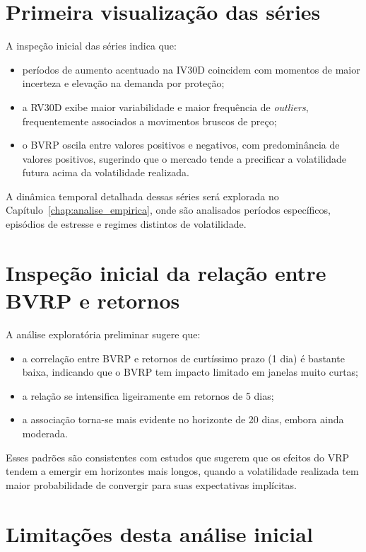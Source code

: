 \section{Primeira visualização das séries}

A inspeção inicial das séries indica que:

\begin{itemize}
    \item períodos de aumento acentuado na IV30D coincidem com momentos de maior
          incerteza e elevação na demanda por proteção;
    \item a RV30D exibe maior variabilidade e maior frequência de \textit{outliers},
          frequentemente associados a movimentos bruscos de preço;
    \item o BVRP oscila entre valores positivos e negativos, com predominância
          de valores positivos, sugerindo que o mercado tende a precificar a
          volatilidade futura acima da volatilidade realizada.
\end{itemize}

A dinâmica temporal detalhada dessas séries será explorada no
Capítulo~\ref{chap:analise_empirica}, onde são analisados períodos específicos,
episódios de estresse e regimes distintos de volatilidade.

\section{Inspeção inicial da relação entre BVRP e retornos}

A análise exploratória preliminar sugere que:

\begin{itemize}
    \item a correlação entre BVRP e retornos de curtíssimo prazo (1 dia) é
          bastante baixa, indicando que o BVRP tem impacto limitado em janelas
          muito curtas;
    \item a relação se intensifica ligeiramente em retornos de 5 dias;
    \item a associação torna-se mais evidente no horizonte de 20 dias, embora
          ainda moderada.
\end{itemize}

Esses padrões são consistentes com estudos que sugerem que os efeitos do VRP
tendem a emergir em horizontes mais longos, quando a volatilidade realizada tem
maior probabilidade de convergir para suas expectativas implícitas.

\section{Limitações desta análise inicial}

